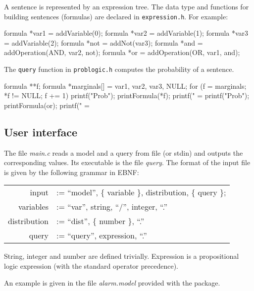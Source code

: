 \documentclass{amsart}
\begin{document}
A sentence is represented by an expression tree. The data type and
functions for building sentences (formulas) are declared in
\verb|expression.h|. For example:
\begin{code}
  formula *var1 = addVariable(0);
  formula *var2 = addVariable(1);
  formula *var3 = addVariable(2);
  formula *not  = addNot(var3);
  formula *and  = addOperation(AND, var2, not);
  formula *or   = addOperation(OR, var1, and);
\end{code}

The \verb|query| function in \verb|problogic.h| computes the probability
of a sentence.
\begin{code}
  formula **f;  
  formula *marginals[] = {var1, var2, var3, NULL};
  for (f = marginals; *f != NULL; f += 1) {
    printf("Prob{"); printFormula(*f); printf("} = %
  }
  printf("Prob{"); printFormula(or); printf("} = %
\end{code}

\subsection{User interface}

The file \emph{main.c} reads a model and a query from file (or stdin)
and outputs the corresponding values. Its executable is the file
\emph{query}. The format of the input file is given by the following
grammar in EBNF:
\begin{center}
\begin{tabular}{rl}
  input &:= ``model'',  \{ variable \},  distribution,  \{ query \};\\
  variables & :=   ``var'',  string, ``/'', integer, ``.'' \\
  distribution & := ``dist'', \{ number \}, ``.''\\
  query & :=  ``query'', expression, ``.''
\end{tabular}
\end{center}
String, integer and number are defined trivially. Expression is a
propositional logic expression (with the standard operator precedence).

An example is given in the file \emph{alarm.model} provided with the
package.
\end{document}
